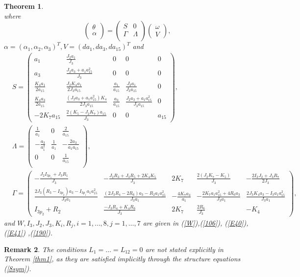 \documentclass[12pt]{article}
\newtheorem{theorem}{Theorem}[section]
\newtheorem{remark}[theorem]{Remark}
\begin{document}
\begin{theorem}
\begin{equation}
\end{equation} 
 where 
\begin{equation}\label{coframe}
\begin{pmatrix}
\theta\\
\alpha\\
\end{pmatrix}=
\begin{pmatrix}
S&0\\
\Gamma&\Lambda\\
\end{pmatrix}
\begin{pmatrix}
\omega\\
V
\end{pmatrix},
\end{equation}
$\alpha=(\alpha_1,\alpha_2,\alpha_3)^T, V=(da_1, da_3,da_{15})^T$ and
\begin{equation}\label{s3-10}
\begin{aligned}
&S=\begin{pmatrix}
a_1&\frac{J_2a_1}{J_3}&0&0&0\\
a_3&\frac{J_2a_3+a_1a_{15}^2}{J_3}&0&0&0\\
\frac{K_4a_1}{2a_{15}}&\frac{J_2K_4a_1}{2J_3a_{15}}&\frac{a_1}{a_{15}}&\frac{J_2a_1}{J_3a_{15}}&0\\
\frac{K_4a_3}{2a_{15}}&\frac{(J_2a_3+a_1a_{15}^2)K_4}{2J_3a_{15}}&\frac{a_3}{a_{15}}&\frac{J_2a_3+a_1a_{15}^2}{J_3a_{15}}&0\\
-2K_7a_{15}&\frac{2(K_5-J_2K_7)a_{15}}{J_3}&0&0&a_{15}
\end{pmatrix},\\
&\Lambda=\begin{pmatrix}
\frac{1}{a_1}&0&\frac{2}{a_{15}}\\
-\frac{a_3}{a_1^2}&\frac{1}{a_1}&-\frac{2a_3}{a_1a_{15}}\\
0&0&\frac{1}{a_{15}}\\
\end{pmatrix},\\
 &\Gamma=\begin{pmatrix}
-\frac{J_2I_{3p_1}+J_3R_1}{J_3}&-\frac{J_2R_3+J_3R_5+2K_4K_5}{J_3}&2K_7&\frac{2(J_2K_7-K_5)}{J_3}&-\frac{2I_3J_2+J_3R_7}{2J_3}\\
\frac{2J_3(R_3-I_{3p_2})a_3-I_{3p_1}a_1a_{15}^2}{J_3a_1}&\frac{(2J_3R_4-2R_6)a_3-R_2a_1a_{15}^2}{J_3a_1}&-\frac{4K_7a_3}{a_1}&-\frac{2K_7a_1a_{15}^2+4R_6a_3}{J_3a_1}&\frac{2J_3K_4a_3-I_3a_1a_{15}^2}{J_3a_1}\\
I_{3p_2}+R_{2}&\frac{-J_3R_4+K_4R_6}{J_3}&2K_7&\frac{2R_6}{J_3}&-K_4
\end{pmatrix},
\end{aligned}
\end{equation}
and $W,I_3,J_2, J_3, K_i,R_j, i=1,\dots,8, j=1,\dots,7$ are given in (\ref{W}),(\ref{106}), (\ref{E40}), (\ref{E41}) ,(\ref{190}).
\end{theorem}
\begin{remark}
The conditions $L_1=\dots=L_{12}=0$ are not stated explicitly in Theorem \ref{thm1}, as they are satisfied implicitly through the structure equations (\ref{8sym}).
\end{remark}
\end{document}
